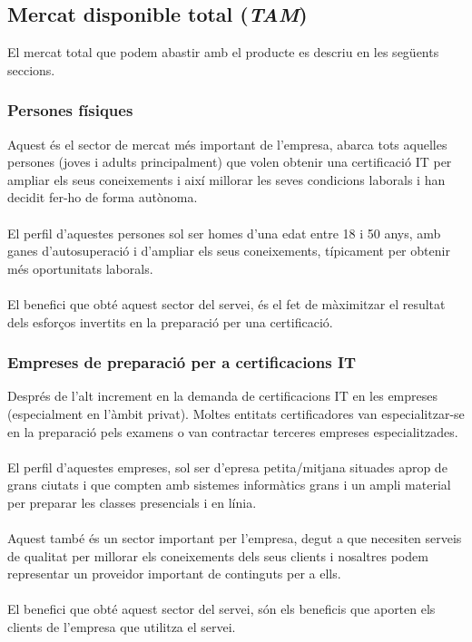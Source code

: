 \documentclass[12pt]{article}
\begin{document}
\subsection{Mercat disponible total (\textit{TAM})}
El mercat total que podem abastir amb el producte es descriu en les següents seccions.
\subsubsection{Persones físiques}
Aquest és el sector de mercat més important de l'empresa, abarca tots aquelles persones (joves i adults principalment) que volen obtenir una certificació IT per ampliar els seus coneixements i així millorar les seves condicions laborals i han decidit fer-ho de forma autònoma.
\\\\El perfil d'aquestes persones sol ser homes d'una edat entre 18 i 50 anys, amb ganes d'autosuperació i d'ampliar els seus coneixements, típicament per obtenir més oportunitats laborals.
\\\\El benefici que obté aquest sector del servei, és el fet de màximitzar el resultat dels esforços invertits en la preparació per una certificació.

\subsubsection{Empreses de preparació per a certificacions IT}
Després de l'alt increment en la demanda de certificacions IT en les empreses (especialment en l'àmbit privat). Moltes entitats certificadores van especialitzar-se en la preparació pels examens o van contractar terceres empreses especialitzades.
\\\\El perfil d'aquestes empreses, sol ser d'epresa petita/mitjana situades aprop de grans ciutats i que compten amb sistemes informàtics grans i un ampli material per preparar les classes presencials i en línia.
\\\\Aquest també és un sector important per l'empresa, degut a que necesiten serveis de qualitat per millorar els coneixements dels seus clients i nosaltres podem representar un proveidor important de continguts per a ells.
\\\\El benefici que obté aquest sector del servei, són els beneficis que aporten els clients de l'empresa que utilitza el servei.
\end{document}
